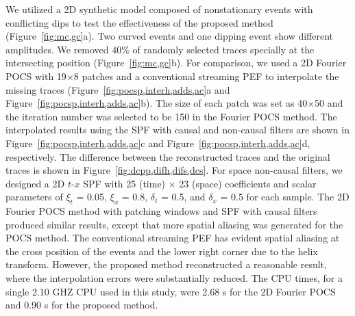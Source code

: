 We utilized a 2D synthetic model composed of nonstationary events with
conflicting dips to test the effectiveness of the proposed method
(Figure~\ref{fig:mc,gc}a). Two curved events and one dipping event
show different amplitudes. We removed $40\%$ of randomly selected
traces specially at the intersecting position
(Figure~\ref{fig:mc,gc}b). For comparison, we used a 2D Fourier POCS
with 19$\times$8 patches and a conventional streaming PEF
\cite[]{Fomel16} to interpolate the missing traces
(Figure~\ref{fig:pocsp,interh,adds,ac}a and
Figure~\ref{fig:pocsp,interh,adds,ac}b). The size of each patch was
set as 40$\times$50 and the iteration number was selected to be 150 in
the Fourier POCS method. The interpolated results using the SPF with
causal and non-causal filters are shown in
Figure~\ref{fig:pocsp,interh,adds,ac}c and
Figure~\ref{fig:pocsp,interh,adds,ac}d, respectively.  The difference
between the reconstructed traces and the original traces is shown in
Figure~\ref{fig:dcpp,difh,difs,dcs}. For space non-causal filters, we
designed a 2D $t$-$x$ SPF with 25 (time) $\times$ 23 (space)
coefficients and scalar parameters of $\xi_t$ = 0.05, $\xi_x$ = 0.8,
$\delta_t$ = 0.5, and $\delta_x$ = 0.5 for each sample.  The 2D
Fourier POCS method with patching windows and SPF with causal filters
produced similar results, except that more spatial aliasing was
generated for the POCS method.  The conventional streaming PEF has
evident spatial aliasing at the cross position of the events and the
lower right corner due to the helix transform. However, the proposed
method reconstructed a reasonable result, where the interpolation
errors were substantially reduced. The CPU times, for a single 2.10
GHZ CPU used in this study, were 2.68 s for the 2D Fourier POCS and
0.90 s for the proposed method.


                       

